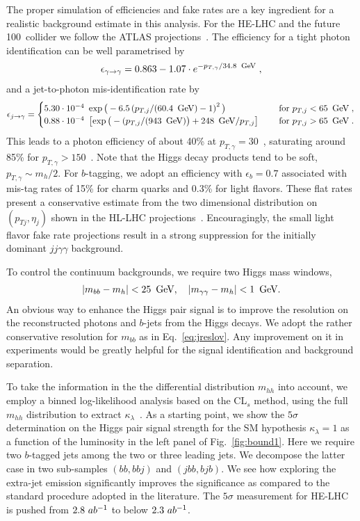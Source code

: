 The proper simulation of efficiencies and fake rates are a key
ingredient for a realistic background estimate in this analysis.  For
the HE-LHC and the future 100~\UTeV collider we follow the ATLAS
projections~\cite{ATL-PHYS-PUB-2016-026}. The efficiency for a tight photon 
identification can be well parametrised by
%
\begin{align}
\epsilon_{\gamma\to\gamma} = 0.863 - 1.07 \cdot e^{-p_{T,\gamma}/34.8~\GeV}\;,
\end{align}
%
and a jet-to-photon mis-identification rate by
\begin{align}
\epsilon_{j\to\gamma} = 
\begin{cases} 
5.30\cdot 10^{-4}  \ \exp\big( -6.5 \left( p_{T,j}/(60.4~\GeV)- 1 \right)^2 \big) 
\quad &\text{ for } p_{T,j} <65~\GeV \;, \\
0.88 \cdot 10^{-4} \  \left[ \exp \big( -(p_{T,j}/(943~\GeV) \big) +248~\GeV/p_{T,j}\right]
\quad &\text{ for } p_{T,j} >65~\GeV \;.
\end{cases}
\end{align}
%
This leads to a photon efficiency of about 40\% at $p_{T,\gamma}=30$~\UGeV,
saturating around 85\% for $p_{T,\gamma}>150$~\UGeV. Note that the 
Higgs decay products tend to be soft, $p_{T,\gamma}\sim m_h/2$. 
For $b$-tagging, we adopt an efficiency with $\epsilon_b =0.7$ associated 
with mis-tag rates of 15\% for charm quarks and 0.3\% for
light flavors. These flat rates present a conservative estimate from
the two dimensional distribution on $(p_{Tj},\eta_j)$ shown in the
HL-LHC projections~\cite{Kling:2016lay}. Encouragingly, the small light
flavor fake rate projections result in a strong suppression for the
initially dominant $jj\gamma\gamma$ background.

To control the continuum backgrounds, we require two Higgs mass windows,
%
\begin{align}
 |m_{bb}-m_h|<25~\,\text{Ge\hspace{-.08em}V}, \quad 
 |m_{\gamma\gamma}-m_h|<1~\,\text{Ge\hspace{-.08em}V}  .
 \label{eq:jreslov}
\end{align}
%
An obvious way to enhance the Higgs pair signal is to improve the
resolution on the reconstructed photons and $b$-jets from the Higgs
decays.  We adopt the rather conservative resolution for $m_{bb}$ as
in Eq.~\eqref{eq:jreslov}. Any improvement on it in experiments would
be greatly helpful for the signal identification and background
separation.  
\medskip

To take the information in the the differential distribution
$m_{hh}$ into account, we employ a binned log-likelihood analysis based on the 
CL$_{s}$ method, using the full $m_{hh}$ distribution to extract 
$\kappa_{\lambda}$~\cite{Read:2002hq}. As a starting point, we show the $5\sigma$ 
determination on the Higgs pair signal strength for the SM hypothesis $\kappa_{\lambda}=1$ as a 
function of the luminosity in the left panel of Fig.~\ref{fig:bound1}. Here 
we require two $b$-tagged jets among the two or three leading jets. We 
decompose the latter case in two  sub-samples $(bb,bbj)$ and $(jbb,bjb)$. 
We see how exploring the extra-jet emission significantly improves the 
significance as compared to the standard procedure adopted in the 
literature. The $5\sigma$ measurement for HE-LHC is pushed from 
$2.8~ab^{-1}$ to below $2.3~ab^{-1}$. 

